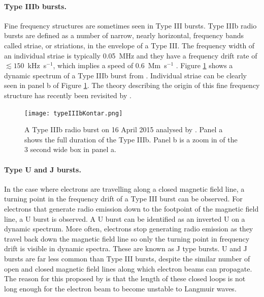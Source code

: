 \paragraph{Type IIIb bursts.}

Fine frequency structures are sometimes seen in Type III bursts. Type IIIb radio bursts are defined as a number of narrow, nearly horizontal, frequency bands called striae, or striations, in the envelope of a Type III. The frequency width of an individual striae is typically 0.05~MHz \citep{McLean1985} and they have a frequency drift rate of $\lesssim 150$~kHz~s$^{-1}$, which implies a speed of 0.6~Mm~s$^{-1}$ \cite{Sharykin2018}. Figure \ref{fig:typeIIIbKontar} shows a dynamic spectrum of a Type IIIb burst from \cite{Kontar2017}. Individual striae can be clearly seen in panel b of Figure \ref{fig:typeIIIbKontar}. The theory describing the origin of this fine frequency structure has recently been revisited by \cite{Reid2021}.

\begin{figure}[ht]
\centering
\texttt{[image: typeIIIbKontar.png]}
\caption[The Type IIIb radio burst from \cite{Kontar2017}]{A Type IIIb radio burst on 16 April 2015 analysed by \cite{Kontar2017}. Panel a shows the full duration of the Type IIIb. Panel b is a zoom in of the 3 second wide box in panel a.}
\label{fig:typeIIIbKontar}
\end{figure}

\paragraph{Type U and J bursts.}

In the case where electrons are travelling along a closed magnetic field line, a turning point in the frequency drift of a Type III burst can be observed. For electrons that generate radio emission down to the footpoint of the magnetic field line, a U burst is observed. A U burst can be identified as an inverted U on a dynamic spectrum. More often, electrons stop generating radio emission as they travel back down the magnetic field line so only the turning point in frequency drift is visible in dynamic spectra. These are known as J type bursts. U and J bursts are far less common than Type III bursts, despite the similar number of open and closed magnetic field lines along which electron beams can propagate. The reason for this proposed by \cite{Reid2017} is that the length of these closed loops is not long enough for the electron beam to become unstable to Langmuir waves.

